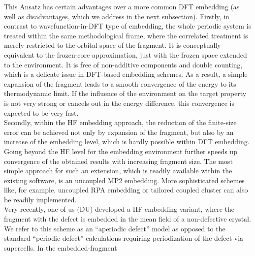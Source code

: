\documentclass[a4paper,11pt,headings=normal]{scrartcl}
\begin{document}
This Ansatz has certain advantages over a more common DFT embedding (as 
well as disadvantages, which we address in the next subsection). Firstly, in 
contrast to wavefunction-in-DFT type of embedding,  the whole periodic 
system is treated within the same methodological frame, where the correlated 
treatment is merely restricted to the orbital space of the fragment. It is 
conceptually equivalent to the frozen-core approximation, just with the frozen 
space extended to the environment. It is free of non-additive components and 
double counting, which is a delicate issue in  DFT-based embedding schemes. As 
a result, a simple expansion of the fragment leads to a smooth convergence of 
the energy to its thermodynamic limit. If  the influence of the environment on the 
target property is not very strong or cancels out in the energy 
difference, this convergence is expected to be very fast.\\
Secondly, within the HF embedding approach, the reduction of the finite-size 
error can be achieved not only by expansion of the fragment, but also by an 
increase of the embedding level, which is hardly possible within DFT embedding. 
Going beyond the HF level for the embedding environment further speeds up 
convergence of the obtained results with increasing fragment size. The most simple 
approach for such an extension, which is readily available within the existing 
software, is an uncoupled MP2 embedding.\autocite{mullan21} More sophisticated 
schemes like, for example, uncoupled RPA embedding\autocite{schaefer21} or 
tailored coupled cluster\autocite{kats20} can also be readily implemented.\\
Very recently, one of us (DU) developed a HF embedding variant, 
where the fragment with the defect is embedded in the mean field of a 
non-defective crystal.\autocite{Lavroff2024} We refer to this scheme as an 
``aperiodic defect'' model as opposed to the standard ``periodic defect'' 
calculations 
requiring periodization of the defect via supercells. In the embedded-fragment 
\end{document}
